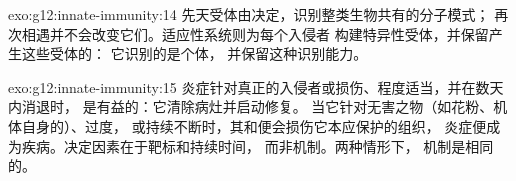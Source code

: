 \begin{solution}{exo:g12:innate-immunity:14}
先天受体由决定，识别整类生物共有的分子模式；
再次相遇并不会改变它们。适应性系统则为每个入侵者
构建特异性受体，并保留产生这些受体的：
它识别的是个体，
并保留这种识别能力。
\end{solution}

\begin{solution}{exo:g12:innate-immunity:15}
炎症针对真正的入侵者或损伤、程度适当，并在数天内消退时，
是有益的：它清除病灶并启动修复。
当它针对无害之物（如花粉、机体自身的）、过度，
或持续不断时，其和便会损伤它本应保护的组织，
炎症便成为疾病。决定因素在于靶标和持续时间，
而非机制。两种情形下，
机制是相同的。
\end{solution}

